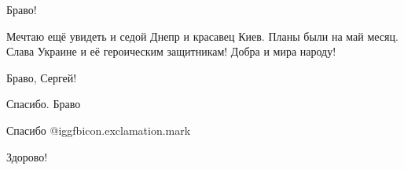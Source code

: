  
 
 
 
 
\zzSecCmt

\begin{itemize} %
Браво!


Мечтаю ещё увидеть и седой Днепр и красавец Киев. Планы были на май месяц. Слава
Украине и её героическим защитникам! Добра и мира народу!

Браво, Сергей!

Спасибо. Браво

Спасибо @igg{fbicon.exclamation.mark}

Здорово!

\end{itemize} %
